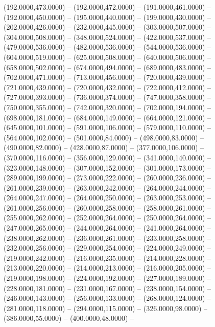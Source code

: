 \begin{scope}[shift={(-190.875,-10.875)}]
  \begin{scope}[draw=black,line join=round,line width=0.208pt]
       (192.0000,473.0000) -- (192.0000,472.0000) --
        (191.0000,461.0000) -- (192.0000,450.0000) -- (195.0000,440.0000) --
        (199.0000,430.0000) -- (202.0000,426.0000) -- (232.0000,445.0000) --
        (303.0000,507.0000) -- (304.0000,508.0000) -- (348.0000,524.0000) --
        (422.0000,537.0000) -- (479.0000,536.0000) -- (482.0000,536.0000) --
        (544.0000,536.0000) -- (604.0000,519.0000) -- (625.0000,508.0000) --
        (640.0000,506.0000) -- (658.0000,502.0000) -- (674.0000,494.0000) --
        (689.0000,483.0000) -- (702.0000,471.0000) -- (713.0000,456.0000) --
        (720.0000,439.0000) -- (721.0000,439.0000) -- (720.0000,432.0000) --
        (722.0000,412.0000) -- (727.0000,393.0000) -- (736.0000,374.0000) --
        (747.0000,358.0000) -- (750.0000,355.0000) -- (742.0000,320.0000) --
        (702.0000,194.0000) -- (698.0000,181.0000) -- (684.0000,149.0000) --
        (664.0000,121.0000) -- (645.0000,101.0000) -- (591.0000,106.0000) --
        (579.0000,110.0000) -- (564.0000,102.0000) -- (501.0000,84.0000) --
        (498.0000,83.0000) -- (490.0000,82.0000) -- (428.0000,87.0000) --
        (377.0000,106.0000) -- (370.0000,116.0000) -- (356.0000,129.0000) --
        (341.0000,140.0000) -- (323.0000,148.0000) -- (307.0000,152.0000) --
        (301.0000,173.0000) -- (289.0000,199.0000) -- (273.0000,222.0000) --
        (260.0000,236.0000) -- (261.0000,239.0000) -- (263.0000,242.0000) --
        (264.0000,244.0000) -- (264.0000,247.0000) -- (264.0000,250.0000) --
        (263.0000,253.0000) -- (261.0000,256.0000) -- (260.0000,258.0000) --
        (258.0000,261.0000) -- (255.0000,262.0000) -- (252.0000,264.0000) --
        (250.0000,264.0000) -- (247.0000,265.0000) -- (244.0000,264.0000) --
        (241.0000,264.0000) -- (238.0000,262.0000) -- (236.0000,261.0000) --
        (233.0000,258.0000) -- (232.0000,256.0000) -- (229.0000,254.0000) --
        (224.0000,249.0000) -- (219.0000,242.0000) -- (216.0000,235.0000) --
        (214.0000,228.0000) -- (213.0000,220.0000) -- (214.0000,213.0000) --
        (216.0000,205.0000) -- (219.0000,198.0000) -- (224.0000,192.0000) --
        (227.0000,189.0000) -- (228.0000,181.0000) -- (231.0000,167.0000) --
        (238.0000,154.0000) -- (246.0000,143.0000) -- (256.0000,133.0000) --
        (268.0000,124.0000) -- (281.0000,118.0000) -- (294.0000,115.0000) --
        (326.0000,98.0000) -- (386.0000,55.0000) -- (400.0000,48.0000) --

\end{scope}
\end{scope}

